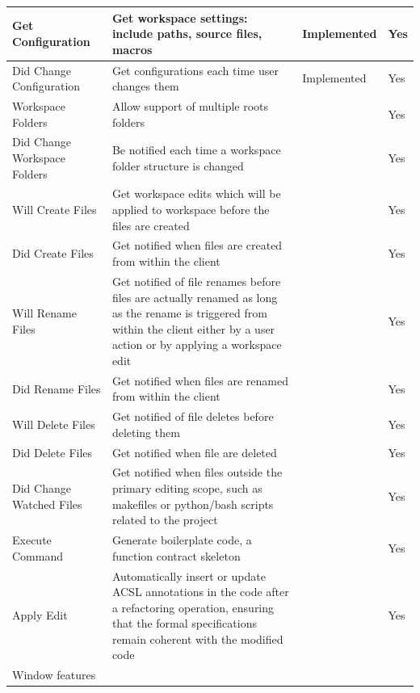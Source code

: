 \documentclass[10pt]{article}
\begin{document}
\begin{singlespace}
\begin{longtable}[H]{|p{3cm}|p{6cm}|p{3cm}|p{2cm}|}
	Get Configuration &
	  Get workspace settings: include paths, source files, macros
	  & Implemented & 
	  Yes \\ \hline
	Did Change Configuration &
	  Get configurations each time user changes them
	  & Implemented & 
	  Yes \\ \hline
	Workspace Folders &
	  Allow support of multiple roots folders
	  & & 
	  Yes \\ \hline
	Did Change Workspace Folders &
	  Be notified each time a workspace folder structure is changed
	  &   &
	  Yes \\ \hline
	Will Create Files &
	  Get workspace edits which will be applied to workspace before the files are created
	  & & 
	  Yes \\ \hline
	Did Create Files &
	  Get notified when files are created from within the client
	  & & 
	  Yes \\ \hline
	Will Rename Files &
	  Get notified of file renames before files are actually renamed as long as the rename is triggered from within the client either by a user action or by applying a workspace edit
	  & & 
	  Yes \\ \hline
	Did Rename Files &
	  Get notified when files are renamed from within the client
	  & & 
	  Yes \\ \hline
	Will Delete Files &
	  Get notified of file deletes before deleting them
	  & & 
	  Yes \\ \hline
	Did Delete Files &
	  Get notified when file are deleted
	  & & 
	  Yes \\ \hline
	Did Change Watched Files &
	  Get notified when files outside the primary editing scope, such as makefiles or python/bash scripts related to the project
	  & & 
	  Yes \\ \hline
	Execute Command &
	  Generate boilerplate code, a function contract skeleton
	  & & 
	  Yes \\ \hline
	Apply Edit &
	  Automatically insert or update ACSL annotations in the code after a refactoring operation, ensuring that the formal specifications remain coherent with the modified code
	  & & 
	  Yes \\ \hline
	\multicolumn{4}{|l|}{Window features} \\ \hline


\end{longtable}
\end{singlespace}
\end{document}
